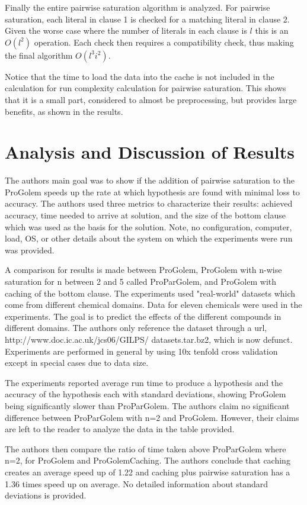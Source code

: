 \documentclass[jair,twoside,11pt,theapa]{article}
\begin{document}
Finally the entire pairwise saturation algorithm is analyzed. For pairwise saturation, each literal in clause 1 is checked for a matching literal in clause 2. Given the worse case where the number of literals in each clause is $l$ this is an $O(l^2)$ operation. Each check then requires a compatibility check, thus making the final algorithm $O(l^3i^2)$. 

Notice that the time to load the data into the cache is not included in the calculation for run complexity calculation for pairwise saturation. This shows that it is a small part, considered to almost be preprocessing, but provides large benefits, as shown in the results.

\section{Analysis and Discussion of Results}
The authors main goal was to show if the addition of pairwise saturation to the ProGolem speeds up the rate at which hypothesis are found with minimal loss to accuracy. The authors used three metrics to characterize their results: achieved accuracy, time needed to arrive at solution, and the size of the bottom clause which was used as the basis for the solution. Note, no configuration, computer, load, OS, or other details about the system on which the experiments were run was provided. 

A comparison for results is made between ProGolem, ProGolem with n-wise saturation for n between 2 and 5 called ProParGolem, and ProGolem with caching of the bottom clause. The experiments used "real-world" datasets which come from different chemical domains. Data for eleven chemicals were used in the experiments. The goal is to predict the effects of the different compounds in different domains. The authors only reference the dataset through a url, http://www.doc.ic.ac.uk/jcs06/GILPS/ datasets.tar.bz2, which is now defunct. Experiments are performed in general by using 10x tenfold cross validation except in special cases due to data size.

The experiments reported average run time to produce a hypothesis and the accuracy of the hypothesis each with standard deviations, showing ProGolem being significantly slower than ProParGolem. The authors claim no significant difference between ProParGolem with n=2 and ProGolem. However, their claims are left to the reader to analyze the data in the table provided.

The authors then compare the ratio of time taken above ProParGolem where n=2, for ProGolem and ProGolemCaching. The authors conclude that caching creates an average speed up of 1.22 and caching plus pairwise saturation has a 1.36 times speed up on average. No detailed information about standard deviations is provided. 
\end{document}
